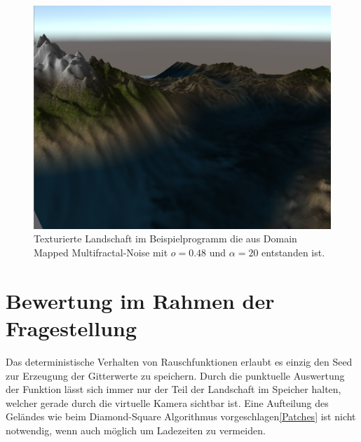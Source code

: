 \begin{figure}[!hbtp]
	\centering
	\includegraphics[width=\textwidth]{images/domainwarped_rendered.png}
	\caption{Texturierte Landschaft im Beispielprogramm die aus Domain Mapped Multifractal-Noise mit $o=0.48$ und $\alpha=20$ entstanden ist.}\label{img.domainwarpedRendered}
\end{figure}


\section{Bewertung im Rahmen der Fragestellung}
Das deterministische Verhalten von Rauschfunktionen erlaubt es einzig den Seed zur Erzeugung der Gitterwerte zu speichern. Durch die punktuelle Auswertung der Funktion lässt sich immer nur der Teil der Landschaft im Speicher halten, welcher gerade durch die virtuelle Kamera sichtbar ist. Eine Aufteilung des Geländes wie beim Diamond-Square Algorithmus vorgeschlagen\ref{Patches} ist nicht notwendig, wenn auch möglich um Ladezeiten zu vermeiden.







